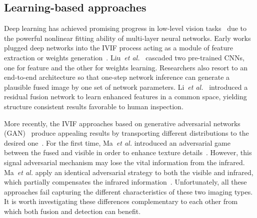 \documentclass[10pt,twocolumn,letterpaper]{article}
\begin{document}
\subsection{Learning-based approaches}
Deep learning has achieved promising progress in low-level vision tasks~\cite{malong,U2Fusion2020,malongcvpr,MFEIF2021,GANMcC,zhao2020didfuse,liu2021searching,liu2019knowledge} due to the powerful nonlinear fitting ability of multi-layer neural networks. Early works plugged deep networks into the IVIF process acting as a module of feature extraction or weights generation~\cite{li2018densefuse,MFEIF2021,smoa,bilevel}. Liu~\emph{et al.}~\cite{bilevel} cascaded two pre-trained CNNs, one for feature and the other for weights learning. Researchers also resort to an end-to-end architecture so that one-step network inference can generate a plausible fused image by one set of network parameters. Li~\emph{et al.}~\cite{rfn2021} introduced a residual fusion network to learn enhanced features in a common space, yielding structure consistent results favorable to human inspection.   

More recently, the IVIF approaches based on generative adversarial networks (GAN)~\cite{R2GAN,SPfusiongan,duanldiscriminator} produce appealing results by transporting different distributions to the desired one~\cite{ma2019fusiongan,ddcgan,GANMcC}. For the first time, Ma~\emph{et al.} introduced an adversarial game between the fused and visible in order to enhance texture details~\cite{ma2019fusiongan}. However, this signal adversarial mechanism may lose the vital information from the infrared. Ma~\emph{et al.} apply an identical adversarial strategy to both the visible and infrared, which partially compensates the infrared information~\cite{ddcgan}. Unfortunately, all these approaches fail capturing the different characteristics of these two imaging types. It is worth investigating these differences complementary to each other from which both fusion and detection can benefit.
\end{document}
